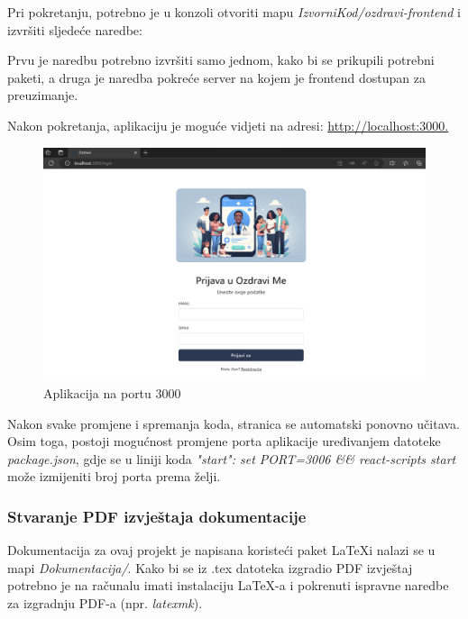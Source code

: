 			Pri pokretanju, potrebno je u konzoli otvoriti mapu \textit{IzvorniKod/ozdravi-frontend} i izvršiti sljedeće naredbe:
			

			Prvu je naredbu potrebno izvršiti samo jednom, kako bi se prikupili potrebni paketi, a druga je naredba pokreće server na kojem je frontend dostupan za preuzimanje.
			
			\newpage \noindent Nakon pokretanja, aplikaciju je moguće vidjeti na adresi: \url{http://localhost:3000.}\\
			\begin{figure}[H]
				\includegraphics[width=\textwidth]{slike/loc3000.png} 
				\caption{Aplikacija na portu 3000} 
			\end{figure}
			Nakon svake promjene i spremanja koda, stranica se automatski ponovno učitava. Osim toga, postoji mogućnost promjene porta aplikacije uređivanjem datoteke \textit{package.json}, 
			gdje se u liniji koda \textit{"start": set PORT=3006 \&\& react-scripts start} može izmijeniti broj porta prema želji.
			
			
			\subsubsection*{Stvaranje PDF izvještaja dokumentacije}
			Dokumentacija za ovaj projekt je napisana koristeći paket \LaTeX  i nalazi se u mapi \textit{Dokumentacija/}. Kako bi se iz .tex datoteka izgradio PDF izvještaj potrebno je na računalu imati instalaciju \LaTeX-a i pokrenuti ispravne naredbe za izgradnju PDF-a (npr. \textit{latexmk}).
			\eject 